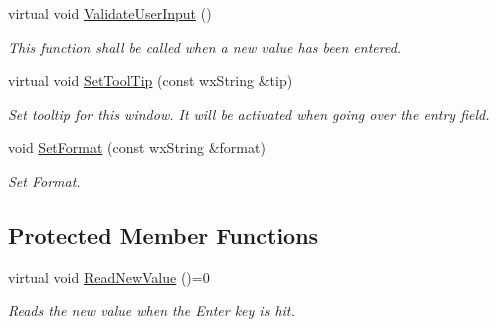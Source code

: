 \begin{DoxyCompactItemize}
virtual void \mbox{\hyperlink{class_obj_cryst_1_1_w_x_field_par_base_ae011448b1dfc529fdff60f057726397b}{Validate\+User\+Input}} ()
\begin{DoxyCompactList}\small\item\em This function shall be called when a new value has been entered. \end{DoxyCompactList}\item 
\mbox{\label{class_obj_cryst_1_1_w_x_field_par_base_a8070d62fbc3bbd653a1514632aaf793e}} 
virtual void \mbox{\hyperlink{class_obj_cryst_1_1_w_x_field_par_base_a8070d62fbc3bbd653a1514632aaf793e}{Set\+Tool\+Tip}} (const wx\+String \&tip)
\begin{DoxyCompactList}\small\item\em Set tooltip for this window. It will be activated when going over the entry field. \end{DoxyCompactList}\item 
\mbox{\label{class_obj_cryst_1_1_w_x_field_par_base_af695c4844533513136249b7568f36183}} 
void \mbox{\hyperlink{class_obj_cryst_1_1_w_x_field_par_base_af695c4844533513136249b7568f36183}{Set\+Format}} (const wx\+String \&format)
\begin{DoxyCompactList}\small\item\em Set Format. \end{DoxyCompactList}\end{DoxyCompactItemize}
\subsection*{Protected Member Functions}
\begin{DoxyCompactItemize}
\item 
\mbox{\label{class_obj_cryst_1_1_w_x_field_par_base_ae8a24ee708e2a61f42e2cc64566d3537}} 
virtual void \mbox{\hyperlink{class_obj_cryst_1_1_w_x_field_par_base_ae8a24ee708e2a61f42e2cc64566d3537}{Read\+New\+Value}} ()=0
\begin{DoxyCompactList}\small\item\em Reads the new value when the Enter key is hit. \end{DoxyCompactList}\end{DoxyCompactItemize}
